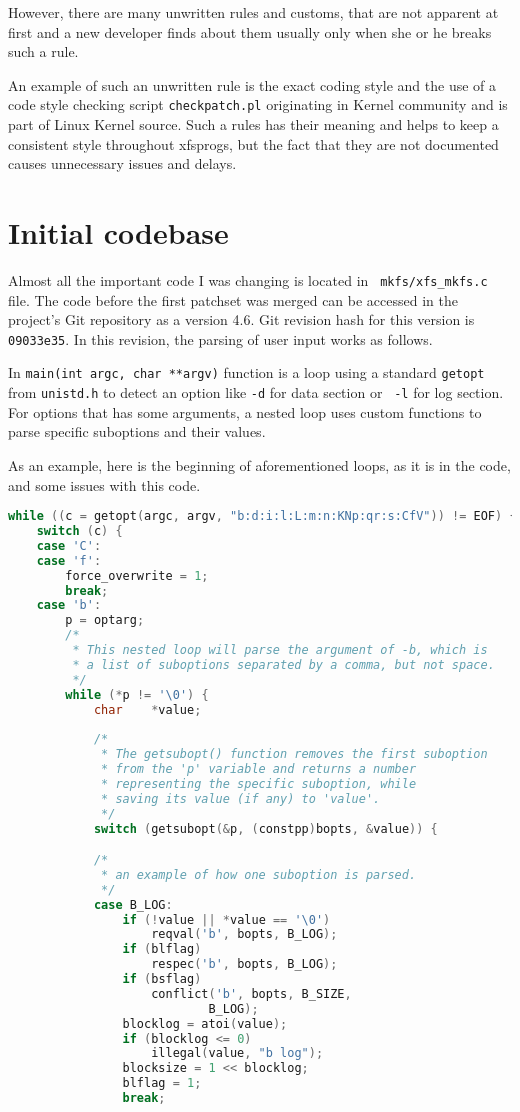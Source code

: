 However, there are many unwritten rules and customs, that are not apparent
at first and a new developer finds about them usually only when she or he
breaks such a rule.

An example of such an unwritten rule is the exact coding style and the use of
a code style checking script {\tt checkpatch.pl} originating in Kernel
community and is part of Linux Kernel source. Such a rules has their
meaning and helps to keep a consistent style throughout xfsprogs, but the
fact that they are not documented causes unnecessary issues and delays.

\section{Initial codebase}\label{chap:refactoring:initialcodebase}

Almost all the important code I was changing is located in {\tt
mkfs/xfs\_mkfs.c} file. The code before the first patchset was merged can
be accessed in the project's Git repository as a version 4.6. Git revision
hash for this version is {\tt 09033e35}. In this revision, the parsing of
user input works as follows.

In {\tt main(int argc, char **argv)} function is a loop using a
standard {\tt getopt} from {\tt unistd.h} to detect an option like {\tt -d} for data section or {\tt
-l} for log section. For options that has some arguments, a nested loop uses custom functions to
parse specific suboptions and their values.

As an example, here is the beginning of aforementioned loops, as it is in
the code, and some issues with this code.

\begin{lstlisting}[frame=none, basicstyle=\footnotesize\ttfamily,
language=C, numbers=none, numberstyle=\tiny\color{black},
caption= {Part of option-parsing loop from mkfs.xfs with additional
comments.},
label={lst:refactoring:loopexample}]
while ((c = getopt(argc, argv, "b:d:i:l:L:m:n:KNp:qr:s:CfV")) != EOF) {
	switch (c) {
	case 'C':
	case 'f':
		force_overwrite = 1;
		break;
	case 'b':
		p = optarg;
		/*
		 * This nested loop will parse the argument of -b, which is
		 * a list of suboptions separated by a comma, but not space.
		 */
		while (*p != '\0') {
			char	*value;
			
			/*
			 * The getsubopt() function removes the first suboption
			 * from the 'p' variable and returns a number
			 * representing the specific suboption, while
			 * saving its value (if any) to 'value'.
			 */
			switch (getsubopt(&p, (constpp)bopts, &value)) {

			/*
			 * an example of how one suboption is parsed.
			 */
			case B_LOG:
				if (!value || *value == '\0')
					reqval('b', bopts, B_LOG);
				if (blflag)
					respec('b', bopts, B_LOG);
				if (bsflag)
					conflict('b', bopts, B_SIZE,
							B_LOG);
				blocklog = atoi(value);
				if (blocklog <= 0)
					illegal(value, "b log");
				blocksize = 1 << blocklog;
				blflag = 1;
				break;
\end{lstlisting}

